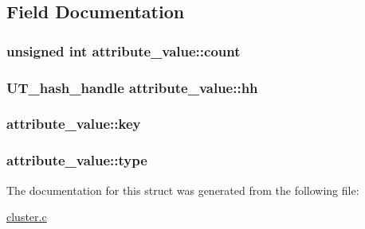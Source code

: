 \subsection{Field Documentation}
\hypertarget{structattribute__value_a5579c0304c2e9ab488ac94905b385045}{
\subsubsection[{count}]{\setlength{\rightskip}{0pt plus 5cm}unsigned int {\bf attribute\_\-value::count}}}
\label{structattribute__value_a5579c0304c2e9ab488ac94905b385045}
\hypertarget{structattribute__value_a9abf5d1758ee0cc4803e3b40fc4481cc}{
\subsubsection[{hh}]{\setlength{\rightskip}{0pt plus 5cm}UT\_\-hash\_\-handle {\bf attribute\_\-value::hh}}}
\label{structattribute__value_a9abf5d1758ee0cc4803e3b40fc4481cc}
\hypertarget{structattribute__value_aa8b5ae41c150e4fefb800d3b1924278d}{
\subsubsection[{key}]{ {\bf attribute\_\-value::key}}}
\label{structattribute__value_aa8b5ae41c150e4fefb800d3b1924278d}
\hypertarget{structattribute__value_a5322c4edde771a7ee0d9fc5f5e45484c}{
\subsubsection[{type}]{ {\bf attribute\_\-value::type}}}
\label{structattribute__value_a5322c4edde771a7ee0d9fc5f5e45484c}


The documentation for this struct was generated from the following file:\begin{DoxyCompactItemize}
\item 
\hyperlink{cluster_8c}{cluster.c}\end{DoxyCompactItemize}
